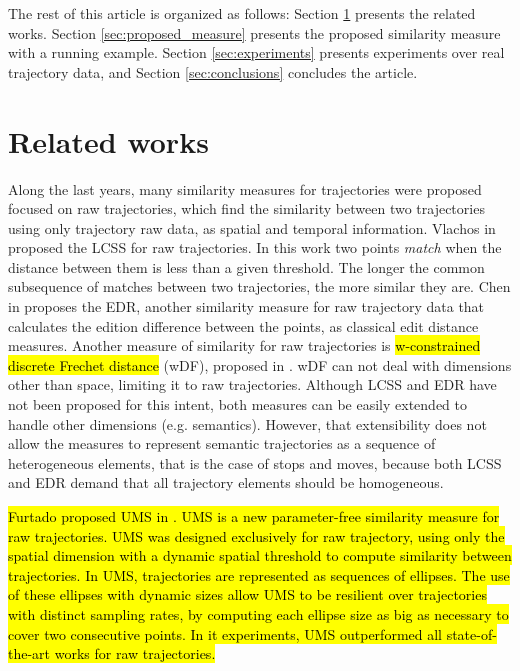 \documentclass[12pt]{article}
\begin{document}
The rest of this article is organized as follows: Section \ref{sec:related} presents the related works. Section \ref{sec:proposed_measure} presents the proposed similarity measure with a running example. Section \ref{sec:experiments} presents experiments over real trajectory data, and Section \ref{sec:conclusions} concludes the article.

\section{Related works} \label{sec:related}
Along the last years, many similarity measures for trajectories were proposed focused on raw trajectories, which find the similarity between two trajectories using only trajectory raw data, as spatial and temporal information. Vlachos in \cite{vlachos2002discovering} proposed the LCSS for raw trajectories. In this work two points \textit{match} when the distance between them is less than a given threshold. The longer the common subsequence of matches between two trajectories, the more similar they are. Chen in \cite{Chen:2005:RFS:1066157.1066213} proposes the EDR, another similarity measure for raw trajectory data that calculates the edition difference between the points, as classical edit distance measures. Another measure of similarity for raw trajectories is \hl{w-constrained discrete Frechet distance} (wDF), proposed in \cite{Ding:2008:ESJ:1440463.1440989}. wDF can not deal with dimensions other than space, limiting it to raw trajectories. Although LCSS and EDR have not been proposed for this intent, both measures can be easily extended to handle other dimensions (e.g. semantics). However, that extensibility does not allow the measures to represent semantic trajectories as a sequence of heterogeneous elements, that is the case of stops and moves, because both LCSS and EDR demand that all trajectory elements should be homogeneous.

\hl{Furtado proposed UMS in {\cite{Furtado-UMS-2018}}. UMS is a new parameter-free similarity measure for raw trajectories. UMS was designed exclusively for raw trajectory, using only the spatial dimension with a dynamic spatial threshold to compute similarity between trajectories. In UMS, trajectories are represented as sequences of ellipses. The use of these ellipses with dynamic sizes allow UMS to be resilient over trajectories with distinct sampling rates, by computing each ellipse size as big as necessary to cover two consecutive points. In it experiments, UMS outperformed all state-of-the-art works for raw trajectories.}
\end{document}
